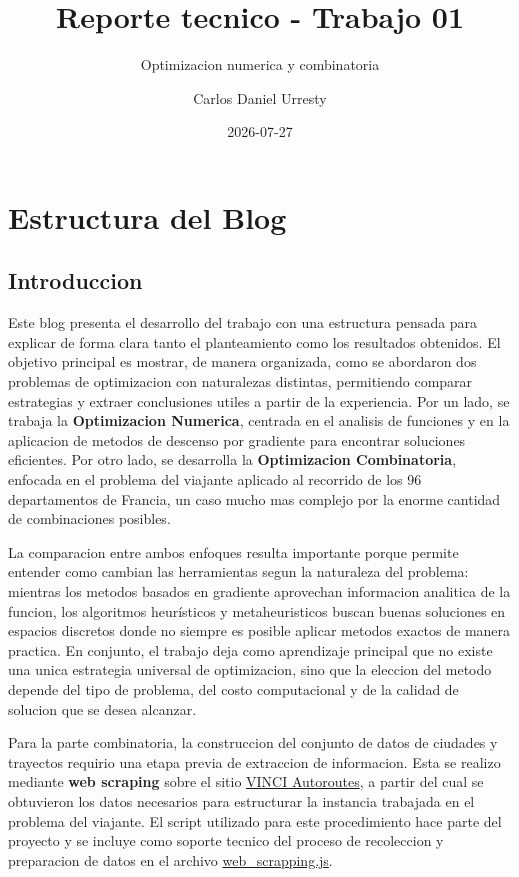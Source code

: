 \documentclass[
  12pt,
  letterpaper,
  DIV=11,
  numbers=noendperiod]{scrartcl}
\title{Reporte tecnico - Trabajo 01}
\subtitle{Optimizacion numerica y combinatoria}
\author{Carlos Daniel Urresty}
\date{2026-07-27}
\renewcommand*\contentsname{Table of contents}
\newcommand\contentsname{Table of contents}
\begin{document}
\maketitle

\renewcommand*\contentsname{Table of contents}
{
\setcounter{tocdepth}{3}
\tableofcontents
}

\section{Estructura del Blog}\label{estructura-del-blog}

\subsection{Introduccion}\label{introduccion}

Este blog presenta el desarrollo del trabajo con una estructura pensada
para explicar de forma clara tanto el planteamiento como los resultados
obtenidos. El objetivo principal es mostrar, de manera organizada, como
se abordaron dos problemas de optimizacion con naturalezas distintas,
permitiendo comparar estrategias y extraer conclusiones utiles a partir
de la experiencia. Por un lado, se trabaja la \textbf{Optimizacion
Numerica}, centrada en el analisis de funciones y en la aplicacion de
metodos de descenso por gradiente para encontrar soluciones eficientes.
Por otro lado, se desarrolla la \textbf{Optimizacion Combinatoria},
enfocada en el problema del viajante aplicado al recorrido de los 96
departamentos de Francia, un caso mucho mas complejo por la enorme
cantidad de combinaciones posibles.

La comparacion entre ambos enfoques resulta importante porque permite
entender como cambian las herramientas segun la naturaleza del problema:
mientras los metodos basados en gradiente aprovechan informacion
analitica de la funcion, los algoritmos heurísticos y metaheuristicos
buscan buenas soluciones en espacios discretos donde no siempre es
posible aplicar metodos exactos de manera practica. En conjunto, el
trabajo deja como aprendizaje principal que no existe una unica
estrategia universal de optimizacion, sino que la eleccion del metodo
depende del tipo de problema, del costo computacional y de la calidad de
solucion que se desea alcanzar.

Para la parte combinatoria, la construccion del conjunto de datos de
ciudades y trayectos requirio una etapa previa de extraccion de
informacion. Esta se realizo mediante \textbf{web scraping} sobre el
sitio \href{https://www.vinci-autoroutes.com/fr/mon-trajet/}{VINCI
Autoroutes}, a partir del cual se obtuvieron los datos necesarios para
estructurar la instancia trabajada en el problema del viajante. El
script utilizado para este procedimiento hace parte del proyecto y se
incluye como soporte tecnico del proceso de recoleccion y preparacion de
datos en el archivo
\href{../2.\%20optimizacion_combinatoria/docs/scraping/web_scrapping.js}{web\_scrapping.js}.
\end{document}
